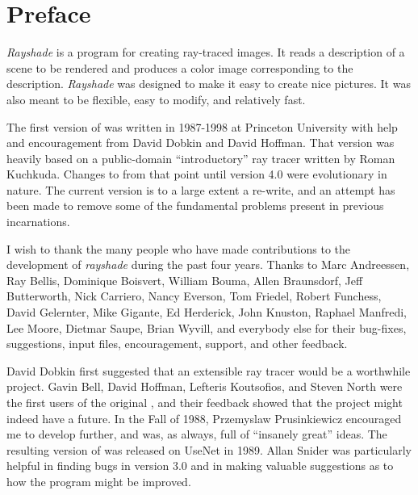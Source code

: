 \chapter*{Preface}

{\em Rayshade} is a program for creating ray-traced images.
It reads a description of a scene to be
rendered and produces a color image corresponding to the
description.
{\em Rayshade} was designed to make it easy to
create nice pictures.
It was also meant to be flexible, easy to modify,
and relatively fast.

The first version of \rayshade was written in 1987-1998 at
Princeton University with help and encouragement from David Dobkin
and David Hoffman.  That version was heavily based on a public-domain
``introductory'' ray tracer written by Roman Kuchkuda.
Changes to \rayshade from that point until version 4.0 were
evolutionary in nature.
The current version is to a large extent a re-write,
and an attempt has been made to remove some of the fundamental
problems present in previous incarnations.

I wish to thank the many people who have made
contributions to the development of {\em rayshade} during the past four years.
Thanks to Marc Andreessen, Ray Bellis, Dominique Boisvert, William Bouma,
Allen Braunsdorf, Jeff Butterworth, Nick Carriero, Nancy Everson, Tom Friedel,
Robert Funchess, David Gelernter, Mike Gigante, Ed Herderick, John Knuston,
Raphael Manfredi, Lee Moore, Dietmar Saupe, Brian Wyvill,
and everybody else for their bug-fixes, suggestions, input files,
encouragement, support, and other feedback.

David Dobkin first suggested that an extensible
ray tracer would be a worthwhile project.  Gavin Bell, David
Hoffman, Lefteris Koutsofios, and Steven North
were the first users of the original \rayshade, and their feedback
showed that the project might indeed have a future.
In the Fall of 1988,
Przemyslaw Prusinkiewicz encouraged me
to develop \rayshade further, and was, as always, full of ``insanely
great'' ideas.  The resulting version of \rayshade was released
on UseNet in 1989.  Allan Snider was particularly helpful in
finding bugs in version 3.0 and in making valuable suggestions
as to how the program might be improved.

